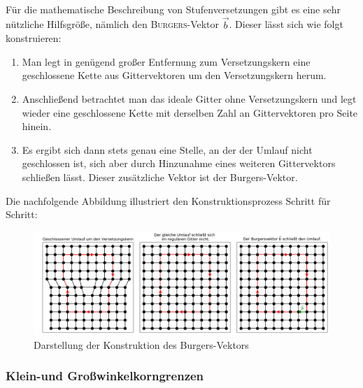 \documentclass[german,  %
parskip=full,  %
]{scrartcl}
\begin{document}
\\\\\\
Für die mathematische Beschreibung von Stufenversetzungen gibt es eine sehr nützliche Hilfsgröße, nämlich den \textsc{Burgers}-Vektor \(\vec{b}\). Dieser lässt sich wie folgt konstruieren:
\begin{enumerate}
\item Man legt in genügend großer Entfernung zum Versetzungskern eine geschlossene Kette aus Gittervektoren um den Versetzungskern herum.
\item Anschließend betrachtet man das ideale Gitter ohne Versetzungskern und legt wieder eine geschlossene Kette mit derselben Zahl an Gittervektoren pro Seite hinein.
\item Es ergibt sich dann stets genau eine Stelle, an der der Umlauf nicht geschlossen ist, sich aber durch Hinzunahme eines weiteren Gittervektors schließen lässt. Dieser zusätzliche Vektor ist der Burgers-Vektor.
\end{enumerate}
Die nachfolgende Abbildung illustriert den Konstruktionsprozess Schritt für Schritt: 
\newpage
\begin{figure}[h!]\centering
\includegraphics[width=\textwidth]{Burgers_Vektor.png}
\caption{Darstellung der Konstruktion des Burgers-Vektors}
\end{figure}

\subsubsection{Klein-und Großwinkelkorngrenzen}
\end{document}
